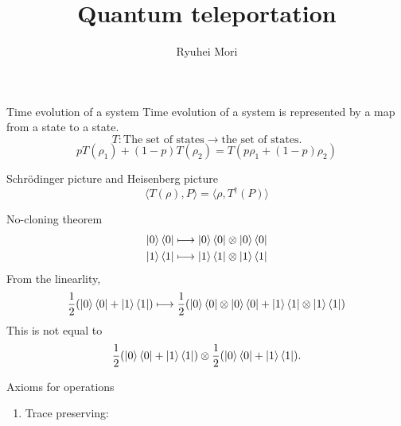 \documentclass{beamer}
\title{Quantum teleportation}
\author{Ryuhei Mori}
\institute{Tokyo Institute of Technology}
\begin{document}
\begin{frame}[plain]
\maketitle
\end{frame}

\begin{frame}{Time evolution of a system}
Time evolution of a system is represented by a map from a state to a state.
\begin{equation*}
T: \text{The set of states} \to \text{the set of states}.
\end{equation*}
\begin{equation*}
p T(\rho_1) + (1-p) T(\rho_2) = T(p\rho_1 + (1-p)\rho_2)
\end{equation*}
\end{frame}




\begin{frame}{Schr\"odinger picture and Heisenberg picture}
\begin{equation*}
\langle T(\rho), P\rangle
=
\langle \rho, T^\dagger(P)\rangle
\end{equation*}
\end{frame}

\begin{frame}{No-cloning theorem}
\begin{align*}
\ket{0}\bra{0} &\longmapsto \ket{0}\bra{0} \otimes \ket{0}\bra{0} \\
\ket{1}\bra{1} &\longmapsto \ket{1}\bra{1} \otimes \ket{1}\bra{1}
\end{align*}
From the linearlity,
\begin{align*}
\frac12(\ket{0}\bra{0} + \ket{1}\bra{1}) &\longmapsto \frac12(\ket{0}\bra{0} \otimes \ket{0}\bra{0} + \ket{1}\bra{1} \otimes \ket{1}\bra{1}) \\
\end{align*}
This is not equal to
\begin{align*}
\frac12(\ket{0}\bra{0} + \ket{1}\bra{1})\otimes \frac12(\ket{0}\bra{0} + \ket{1}\bra{1}).
\end{align*}
\end{frame}

\begin{frame}{Axioms for operations}
\begin{enumerate}
\setlength{\itemsep}{2em}
\item Trace preserving:
\end{enumerate}
\end{frame}
\end{document}

